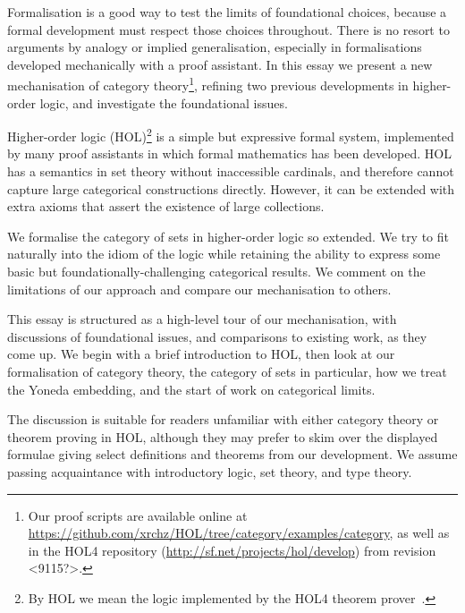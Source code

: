 \documentclass[twoside,titlepage,11pt]{article}
\begin{document}
Formalisation is a good way to test the limits of foundational choices, because a formal development must respect those choices throughout.
There is no resort to arguments by analogy or implied generalisation, especially in formalisations developed mechanically with a proof assistant.
In this essay we present a new mechanisation of category theory\footnote{Our proof scripts are available online at \url{https://github.com/xrchz/HOL/tree/category/examples/category}, as well as in the HOL4 repository (\url{http://sf.net/projects/hol/develop}) from revision <9115?>.}, refining two previous developments in higher-order logic, and investigate the foundational issues.

Higher-order logic (HOL)\footnote{By HOL we mean the logic implemented by the HOL4 theorem prover~\cite{DBLP:conf/tphol/SlindN08}.} is a simple but expressive formal system, implemented by many proof assistants in which formal mathematics has been developed.
HOL has a semantics in set theory without inaccessible cardinals, and therefore cannot capture large categorical constructions directly.
However, it can be extended with extra axioms that assert the existence of large collections. 

We formalise the category of sets in higher-order logic so extended.
We try to fit naturally into the idiom of the logic while retaining the ability to express some basic but foundationally-challenging categorical results.
We comment on the limitations of our approach and compare our mechanisation to others.

This essay is structured as a high-level tour of our mechanisation, with discussions of foundational issues, and comparisons to existing work, as they come up.
We begin with a brief introduction to HOL, then look at our formalisation of category theory, the category of sets in particular, how we treat the Yoneda embedding, and the start of work on categorical limits.

The discussion is suitable for readers unfamiliar with either category theory or theorem proving in HOL, although they may prefer to skim over the displayed formulae giving select definitions and theorems from our development.
We assume passing acquaintance with introductory logic, set theory, and type theory.
\end{document}

